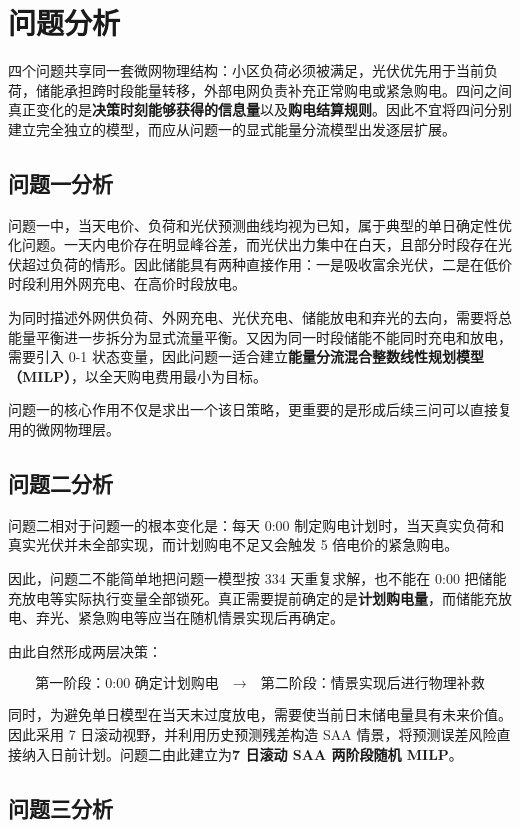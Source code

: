 \section{问题分析}
四个问题共享同一套微网物理结构：小区负荷必须被满足，光伏优先用于当前负荷，储能承担跨时段能量转移，外部电网负责补充正常购电或紧急购电。四问之间真正变化的是\textbf{决策时刻能够获得的信息量}以及\textbf{购电结算规则}。因此不宜将四问分别建立完全独立的模型，而应从问题一的显式能量分流模型出发逐层扩展。

\subsection{问题一分析}

问题一中，当天电价、负荷和光伏预测曲线均视为已知，属于典型的单日确定性优化问题。一天内电价存在明显峰谷差，而光伏出力集中在白天，且部分时段存在光伏超过负荷的情形。因此储能具有两种直接作用：一是吸收富余光伏，二是在低价时段利用外网充电、在高价时段放电。

为同时描述外网供负荷、外网充电、光伏充电、储能放电和弃光的去向，需要将总能量平衡进一步拆分为显式流量平衡。又因为同一时段储能不能同时充电和放电，需要引入 0-1 状态变量，因此问题一适合建立\textbf{能量分流混合整数线性规划模型（MILP）}，以全天购电费用最小为目标。

问题一的核心作用不仅是求出一个该日策略，更重要的是形成后续三问可以直接复用的微网物理层。

\subsection{问题二分析}

问题二相对于问题一的根本变化是：每天 0:00 制定购电计划时，当天真实负荷和真实光伏并未全部实现，而计划购电不足又会触发 5 倍电价的紧急购电。

因此，问题二不能简单地把问题一模型按 334 天重复求解，也不能在 0:00 把储能充放电等实际执行变量全部锁死。真正需要提前确定的是\textbf{计划购电量}，而储能充放电、弃光、紧急购电等应当在随机情景实现后再确定。

由此自然形成两层决策：

\[
\boxed{
\text{第一阶段：0:00 确定计划购电}
\quad\longrightarrow\quad
\text{第二阶段：情景实现后进行物理补救}
}
\]

同时，为避免单日模型在当天末过度放电，需要使当前日末储电量具有未来价值。因此采用 7 日滚动视野，并利用历史预测残差构造 SAA 情景，将预测误差风险直接纳入日前计划。问题二由此建立为\textbf{7 日滚动 SAA 两阶段随机 MILP}。

\subsection{问题三分析}

